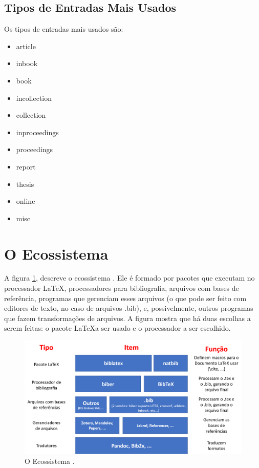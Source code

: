 \subsection{Tipos de Entradas Mais Usados}

Os tipos de entradas mais usados são:
\begin{itemize}
\item article
\item inbook
\item book
\item incollection
\item collection
\item inproceedings
\item proceedings
\item report
\item thesis
\item online
\item misc
\end{itemize}


\section{O Ecossistema }


A figura \ref{fig:mundolatexport}\autocite{bibera2012}, descreve o ecossistema . Ele é formado por pacotes que executam no processador \LaTeX , processadores para bibliografia, arquivos com bases de referência, programas que gerenciam esses arquivos (o que pode ser feito com editores de texto, no caso de arquivos .bib), e, possivelmente, outros programas que fazem transformações de arquivos. A figura mostra que há duas escolhas a serem feitas: o pacote \LaTeX  a ser usado e o processador
a ser escolhido. 

\begin{figure}[hbt]
    \centering
    \includegraphics[width=0.9\linewidth]{Images/mundolatexport}
    \caption{O Ecossistema \parencite{bibera2012}.}
    \label{fig:mundolatexport}
\end{figure}



